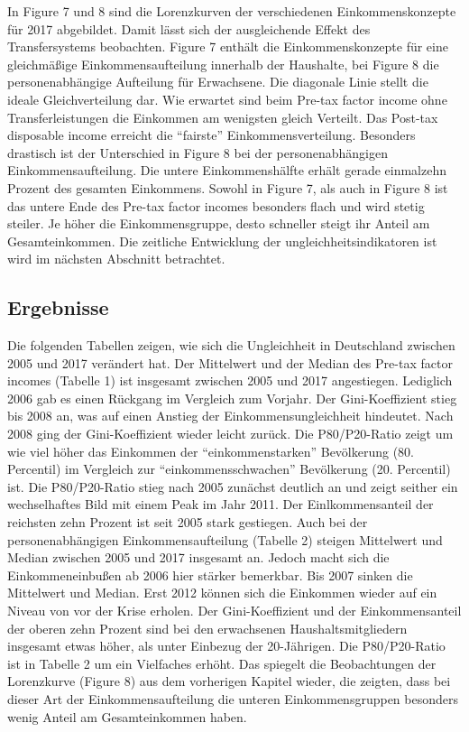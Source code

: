 \documentclass[12pt,]{article}
\begin{document}
In Figure 7 und 8 sind die Lorenzkurven der verschiedenen
Einkommenskonzepte für 2017 abgebildet. Damit lässt sich der
ausgleichende Effekt des Transfersystems beobachten. Figure 7 enthält
die Einkommenskonzepte für eine gleichmäßige Einkommensaufteilung
innerhalb der Haushalte, bei Figure 8 die personenabhängige Aufteilung
für Erwachsene. Die diagonale Linie stellt die ideale Gleichverteilung
dar. Wie erwartet sind beim Pre-tax factor income ohne
Transferleistungen die Einkommen am wenigsten gleich Verteilt. Das
Post-tax disposable income erreicht die ``fairste''
Einkommensverteilung. Besonders drastisch ist der Unterschied in Figure
8 bei der personenabhängigen Einkommensaufteilung. Die untere
Einkommenshälfte erhält gerade einmalzehn Prozent des gesamten
Einkommens. Sowohl in Figure 7, als auch in Figure 8 ist das untere Ende
des Pre-tax factor incomes besonders flach und wird stetig steiler. Je
höher die Einkommensgruppe, desto schneller steigt ihr Anteil am
Gesamteinkommen. Die zeitliche Entwicklung der ungleichheitsindikatoren
ist wird im nächsten Abschnitt betrachtet.

\subsection{Ergebnisse}\label{ergebnisse}

Die folgenden Tabellen zeigen, wie sich die Ungleichheit in Deutschland
zwischen 2005 und 2017 verändert hat. Der Mittelwert und der Median des
Pre-tax factor incomes (Tabelle 1) ist insgesamt zwischen 2005 und 2017
angestiegen. Lediglich 2006 gab es einen Rückgang im Vergleich zum
Vorjahr. Der Gini-Koeffizient stieg bis 2008 an, was auf einen Anstieg
der Einkommensungleichheit hindeutet. Nach 2008 ging der
Gini-Koeffizient wieder leicht zurück. Die P80/P20-Ratio zeigt um wie
viel höher das Einkommen der ``einkommenstarken'' Bevölkerung (80.
Percentil) im Vergleich zur ``einkommensschwachen'' Bevölkerung (20.
Percentil) ist. Die P80/P20-Ratio stieg nach 2005 zunächst deutlich an
und zeigt seither ein wechselhaftes Bild mit einem Peak im Jahr 2011.
Der Einlkommensanteil der reichsten zehn Prozent ist seit 2005 stark
gestiegen. Auch bei der personenabhängigen Einkommensaufteilung (Tabelle
2) steigen Mittelwert und Median zwischen 2005 und 2017 insgesamt an.
Jedoch macht sich die Einkommeneinbußen ab 2006 hier stärker bemerkbar.
Bis 2007 sinken die Mittelwert und Median. Erst 2012 können sich die
Einkommen wieder auf ein Niveau von vor der Krise erholen. Der
Gini-Koeffizient und der Einkommensanteil der oberen zehn Prozent sind
bei den erwachsenen Haushaltsmitgliedern insgesamt etwas höher, als
unter Einbezug der 20-Jährigen. Die P80/P20-Ratio ist in Tabelle 2 um
ein Vielfaches erhöht. Das spiegelt die Beobachtungen der Lorenzkurve
(Figure 8) aus dem vorherigen Kapitel wieder, die zeigten, dass bei
dieser Art der Einkommensaufteilung die unteren Einkommensgruppen
besonders wenig Anteil am Gesamteinkommen haben.
\end{document}
